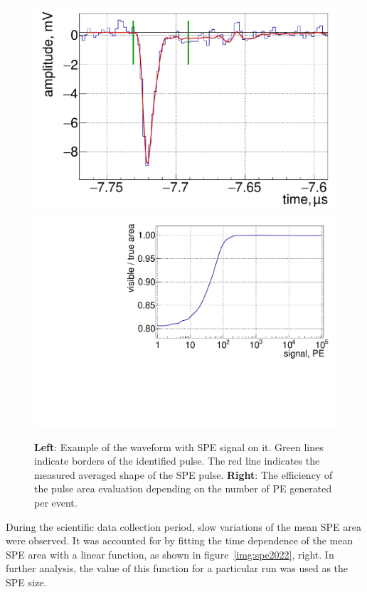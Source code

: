 \documentclass[a4paper,11pt]{article}
\begin{document}
\begin{figure}[htbp]
 \centering
 \includegraphics[width=0.49\linewidth]{images/spe-519-63-t01-fix.pdf}
 \hfill
 \includegraphics[width=0.49\linewidth]{images/spe_area_eff.pdf}
	\caption{\textbf{Left}: Example of the waveform with SPE signal on it. Green lines indicate borders of the identified pulse. The red line indicates the measured averaged shape of the SPE pulse. \textbf{Right}: The efficiency of the pulse area evaluation depending on the number of PE generated per event.}
  \label{img:spe_shape_eff}  
\end{figure}

During the scientific data collection period, slow variations of the mean SPE area were observed. 
It was accounted for by fitting the time dependence of the mean SPE area with a linear function, as shown in figure~\ref{img:spe2022}, right. 
In further analysis, the value of this function for a particular run was used as the SPE size.
\end{document}
